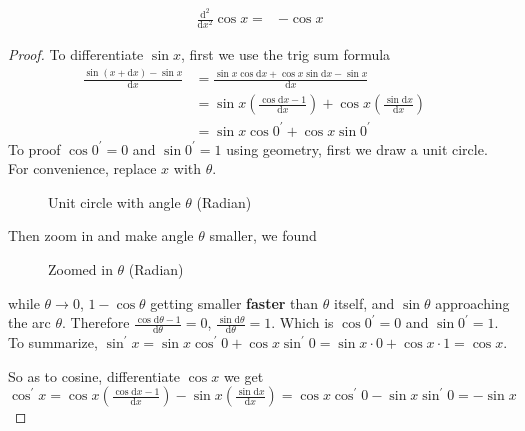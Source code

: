\begin{enumerate}
\begin{align*}
            \frac{\mathrm{d}^2}{\mathrm{d}x^2}\cos x= & -\cos x
        \end{align*}
        \begin{proof}
            To differentiate \(\sin x\), first we use the trig sum formula
            \begin{align*}
                \frac{\sin(x+\mathrm{d}x)-\sin x}{\mathrm{d}x} & =\frac{\sin x\cos\mathrm{d}x+\cos x\sin\mathrm{d}x-\sin x}{\mathrm{d}x} & \\
                                                                & =\sin x\left(\frac{\cos\mathrm{d}x-1}{\mathrm{d}x}\right)+\cos x\left(\frac{\sin\mathrm{d}x}{\mathrm{d}x}\right)\\
                                                                & =\sin x\cos0^\prime+\cos x\sin0^\prime
            \end{align*}
            To proof \(\cos0^\prime=0\) and \(\sin0^\prime=1\) using geometry, first we draw a unit circle. For convenience, replace \(x\) with \(\theta\).
            \begin{figure}[H]
                \centering
                \caption{Unit circle with angle \(\theta\) (Radian)}
            \end{figure}
            Then zoom in and make angle \(\theta\) smaller, we found
            \begin{figure}[H]
                \centering
                \caption{Zoomed in \(\theta\) (Radian)}
            \end{figure}
            while \(\theta\to0\), \(1-\cos\theta\) getting smaller \textbf{faster} than \(\theta\) itself, and \(\sin\theta\) approaching the arc \(\theta\). Therefore \(\frac{\cos\mathrm{d}\theta-1}{\mathrm{d}\theta}=0\), \(\frac{\sin\mathrm{d}\theta}{\mathrm{d}\theta}=1\). Which is \(\cos0^\prime=0\) and \(\sin0^\prime=1\).\\
            \indent To summarize, \(\sin^\prime x=\sin x\cos^\prime 0+\cos x\sin^\prime 0=\sin x\cdot0+\cos x\cdot1=\cos x\).\par
            So as to cosine, differentiate \(\cos x\) we get \(\cos^\prime x=\cos x\left(\frac{\cos\mathrm{d}x-1}{\mathrm{d}x}\right)-\sin x\left(\frac{\sin\mathrm{d}x}{\mathrm{d}x}\right)=\cos x\cos^\prime 0-\sin x\sin^\prime 0=-\sin x\)
        \end{proof}
\end{enumerate}

